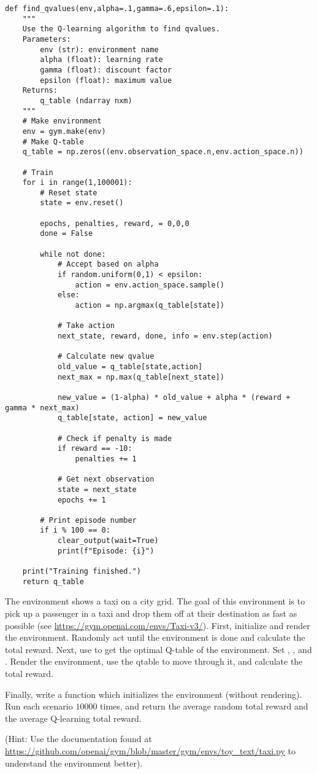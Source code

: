 \begin{lstlisting}
def find_qvalues(env,alpha=.1,gamma=.6,epsilon=.1):
    """
    Use the Q-learning algorithm to find qvalues.
    Parameters:
        env (str): environment name
        alpha (float): learning rate
        gamma (float): discount factor
        epsilon (float): maximum value
    Returns:
        q_table (ndarray nxm)
    """
    # Make environment
    env = gym.make(env)
    # Make Q-table
    q_table = np.zeros((env.observation_space.n,env.action_space.n))

    # Train
    for i in range(1,100001):
        # Reset state
        state = env.reset()

        epochs, penalties, reward, = 0,0,0
        done = False

        while not done:
            # Accept based on alpha
            if random.uniform(0,1) < epsilon:
                action = env.action_space.sample()
            else:
                action = np.argmax(q_table[state])

            # Take action
            next_state, reward, done, info = env.step(action)

            # Calculate new qvalue
            old_value = q_table[state,action]
            next_max = np.max(q_table[next_state])

            new_value = (1-alpha) * old_value + alpha * (reward + gamma * next_max)
            q_table[state, action] = new_value

            # Check if penalty is made
            if reward == -10:
                penalties += 1

            # Get next observation
            state = next_state
            epochs += 1

        # Print episode number
        if i % 100 == 0:
            clear_output(wait=True)
            print(f"Episode: {i}")

    print("Training finished.")
    return q_table
\end{lstlisting}

\begin{problem}
The environment  shows a taxi on a city grid.
The goal of this environment is to pick up a passenger in a taxi and drop them off at their destination as fast as possible (see \url{https://gym.openai.com/envs/Taxi-v3/}).
First, initialize and render the environment. Randomly act until the environment is done and calculate the total reward.
Next, use  to get the optimal Q-table of the environment.
Set , , and .
Render the environment, use the qtable to move through it, and calculate the total reward.

Finally, write a function  which initializes the  environment (without rendering).
Run each scenario $10000$ times, and return the average random total reward and the average Q-learning total reward.

(Hint: Use the documentation found at \url{https://github.com/openai/gym/blob/master/gym/envs/toy_text/taxi.py} to understand the environment better).
\label{prob:taxi}
\end{problem}
